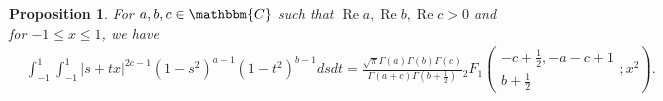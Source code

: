 \documentclass[12pt]{article}
\numberwithin{equation}{section}
\newcommand{\tmop}[1]{\ensuremath{\operatorname{#1}}}
\newtheorem{proposition}[corollary]{Proposition}
{\theorembodyfont{\rmfamily}\newtheorem{remark}[corollary]{Remark}}
\begin{document}
\begin{proposition}
  \label{prop:2}For $a, b, c \in \mathbbm{C}$ such that $\tmop{Re} a,
  \tmop{Re} b, \tmop{Re} c > 0$ and for $- 1 \leqslant x \leqslant 1$, we have
  \begin{eqnarray}
    & \displaystyle\int_{- 1}^1 \displaystyle\int_{- 1}^1 | s + t x |^{2 c - 1} (1 - s^2)^{a - 1} (1 -
    t^2)^{b - 1} d s d t = \frac{\sqrt{\pi} \Gamma (a) \Gamma (b) \Gamma
    (c)}{\Gamma (a + c) \Gamma \left( b + \frac{1}{2} \right)}{}_2 F_1 \left(
    \begin{array}{c}
      - c + \frac{1}{2}, - a - c + 1\\
      b + \frac{1}{2}
    \end{array} ; x^2 \right) .  \label{eqn:stz} & \\
    &  &  \nonumber
  \end{eqnarray}
\end{proposition}
\end{document}
